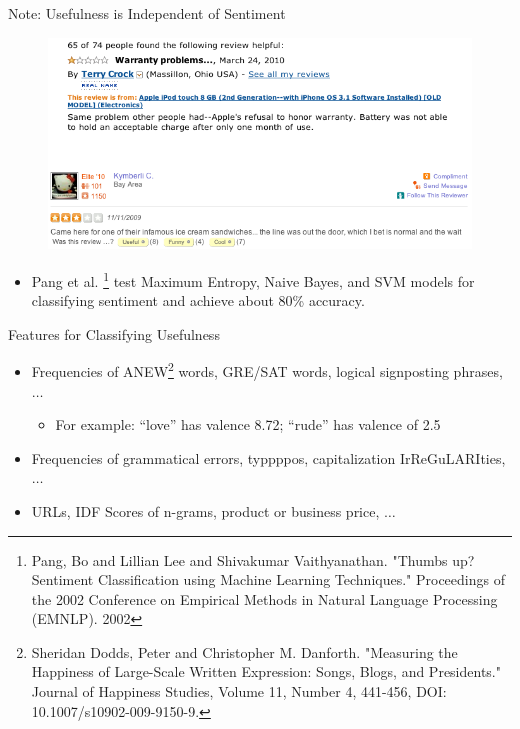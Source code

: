 \documentclass{beamer}
\begin{document}
\begin{frame}{Note: Usefulness is Independent of Sentiment}
\begin{figure}[h]
  \centering
  \includegraphics[scale=.4]{review_ex_2}
\end{figure}
\begin{itemize}
\item Pang et al. \footnote{{\tiny Pang, Bo and Lillian Lee and Shivakumar Vaithyanathan.  "Thumbs
up?  Sentiment Classification using Machine Learning Techniques."
Proceedings of the 2002 Conference on Empirical Methods in Natural
Language Processing (EMNLP). 2002}} test Maximum Entropy, Naive Bayes, and SVM models for classifying sentiment and achieve about 80\% accuracy.\\
\end{itemize}
\end{frame}


\begin{frame}{Features for Classifying Usefulness}
\begin{itemize}
\item Frequencies of ANEW\footnote{{\tiny Sheridan Dodds, Peter and Christopher M. Danforth. "Measuring the Happiness of Large-Scale Written Expression: Songs, Blogs, and Presidents."  Journal of Happiness Studies, Volume 11, Number 4, 441-456, DOI: 10.1007/s10902-009-9150-9. }} words, GRE/SAT words, logical signposting phrases, $\ldots$ 
\begin{itemize}
\item For example: ``love'' has valence 8.72; ``rude'' has valence of 2.5
\end{itemize}
\item Frequencies of grammatical errors, typpppos, capitalization IrReGuLARIties, $\ldots$
\item URLs, IDF Scores of n-grams, product or business price, $\ldots$
\end{itemize}
\end{frame}
\end{document}

